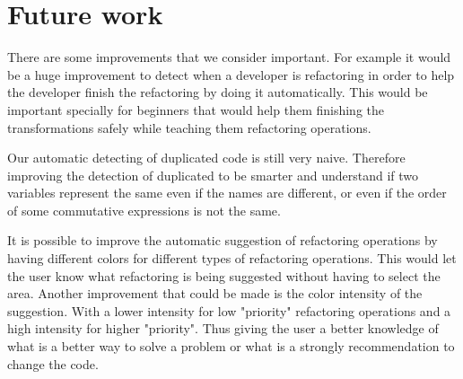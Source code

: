 \section{Future work}
There are some improvements that we consider important. For example it would  %
be a huge improvement to detect when a developer is refactoring in order to help the developer finish the
refactoring by doing it automatically.
This would be important specially for beginners that would help them finishing
the transformations safely while teaching them refactoring operations. %

Our automatic detecting of duplicated code is still very naive.
Therefore improving the detection of duplicated to be smarter and understand if
two variables represent the same even if the names are different, or even if the
 order of some commutative expressions is not the same.



It is possible to improve the automatic suggestion of refactoring operations by
having different colors for different types of refactoring operations.
This would let the user know what refactoring is being suggested without having to
select the area.
Another improvement that could be made is the color intensity of the suggestion.
With a lower intensity for low "priority" refactoring operations and a high intensity
for higher "priority". Thus giving the user a better knowledge of what is a better
way to solve a problem or what is a strongly recommendation to change the code.
